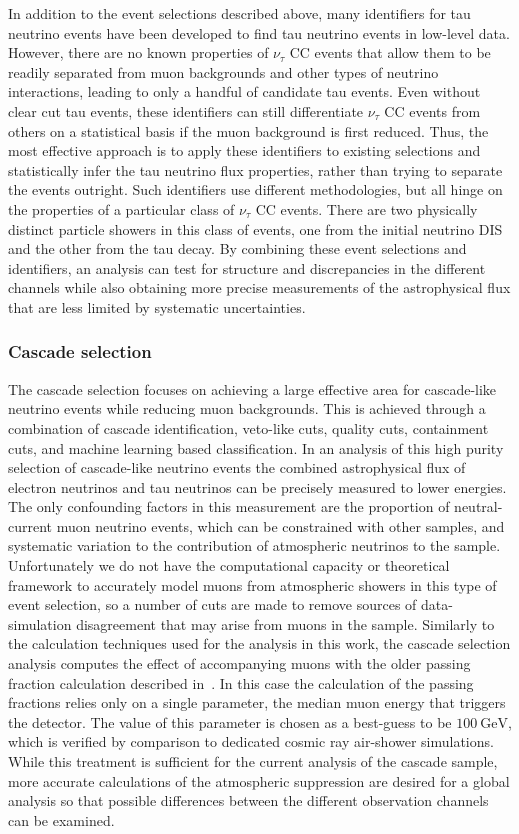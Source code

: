 In addition to the event selections described above, many identifiers for tau neutrino events have been developed to find tau neutrino events in low-level data.
However, there are no known properties of $\nu_\tau$ CC events that allow them to be readily separated from muon backgrounds and other types of neutrino interactions, leading to only a handful of candidate tau events.
Even without clear cut tau events, these identifiers can still differentiate $\nu_\tau$ CC events from others on a statistical basis if the muon background is first reduced.
Thus, the most effective approach is to apply these identifiers to existing selections and statistically infer the tau neutrino flux properties, rather than trying to separate the events outright.
Such identifiers use different methodologies, but all hinge on the properties of a particular class of $\nu_\tau$ CC events.
There are two physically distinct particle showers in this class of events, one from the initial neutrino DIS and the other from the tau decay.
By combining these event selections and identifiers, an analysis can test for structure and discrepancies in the different channels while also obtaining more precise measurements of the astrophysical flux that are less limited by systematic uncertainties.

\subsubsection{Cascade selection}
The cascade selection focuses on achieving a large effective area for cascade-like neutrino events while reducing muon backgrounds.
This is achieved through a combination of cascade identification, veto-like cuts, quality cuts, containment cuts, and machine learning based classification.
In an analysis of this high purity selection of cascade-like neutrino events the combined astrophysical flux of electron neutrinos and tau neutrinos can be precisely measured to lower energies.
The only confounding factors in this measurement are the proportion of neutral-current muon neutrino events, which can be constrained with other samples, and systematic variation to the contribution of atmospheric neutrinos to the sample.
Unfortunately we do not have the computational capacity or theoretical framework to accurately model muons from atmospheric showers in this type of event selection, so a number of cuts are made to remove sources of data-simulation disagreement that may arise from muons in the sample.
Similarly to the calculation techniques used for the analysis in this work, the cascade selection analysis computes the effect of accompanying muons with the older passing fraction calculation described in~\cite{Gaisser:2014bja}.
In this case the calculation of the passing fractions relies only on a single parameter, the median muon energy that triggers the detector.
The value of this parameter is chosen as a best-guess to be $\SI{100}\GeV$, which is verified by comparison to dedicated cosmic ray air-shower simulations.
While this treatment is sufficient for the current analysis of the cascade sample, more accurate calculations of the atmospheric suppression are desired for a global analysis so that possible differences between the different observation channels can be examined.

